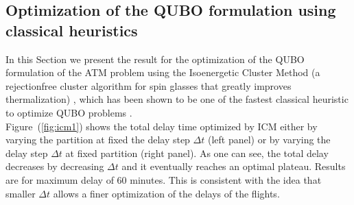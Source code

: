 \subsection{Optimization of the QUBO formulation using classical heuristics}

In this Section we present the result for the optimization of the QUBO
formulation of the ATM problem using the Isoenergetic Cluster Method (a
rejectionfree cluster algorithm for spin glasses that greatly improves
thermalization) \cite{zhu2015}, which has been shown to be one of the fastest
classical heuristic to optimize QUBO problems \cite{mandra2016}.\\

Figure~(\ref{fig:icm1}) shows the total delay time optimized by ICM either by 
varying the partition at fixed the delay step $\Delta t$ (left panel) or by
varying the delay step $\Delta t$ at fixed partition (right panel). As one can
see, the total delay decreases by decreasing $\Delta t$ and it eventually
reaches an optimal plateau. Results are for maximum delay of 60 minutes. This is
consistent with the idea that smaller $\Delta t$ allows a finer optimization of
the delays of the flights.\\

